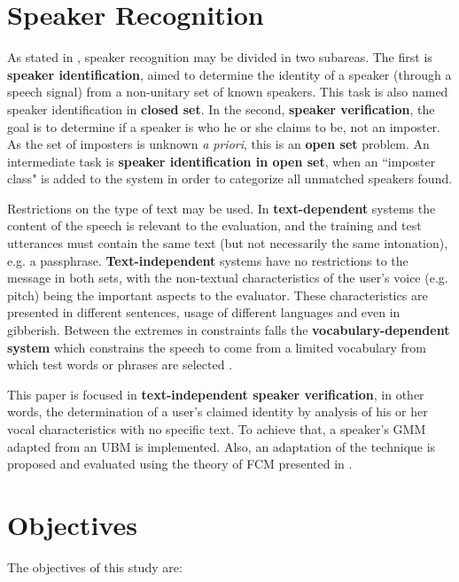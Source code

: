 \section{Speaker Recognition}

As stated in \autocite{pinheiro.2013}, speaker recognition may be divided in two subareas. The first is \textbf{speaker identification}, aimed to determine the identity of a speaker (through a speech signal) from a non-unitary set of known speakers. This task is also named speaker identification in \textbf{closed set}. In the second, \textbf{speaker verification}, the goal is to determine if a speaker is who he or she claims to be, not an imposter. As the set of imposters is unknown \emph{a priori}, this is an \textbf{open set} problem. An intermediate task is \textbf{speaker identification in open set}, when an ``imposter class" is added to the system in order to categorize all unmatched speakers found.

Restrictions on the type of text may be used. In \textbf{text-dependent} systems the content of the speech is relevant to the evaluation, and the training and test utterances must contain the same text (but not necessarily the same intonation), e.g. a passphrase. \textbf{Text-independent} systems have no restrictions to the message in both sets, with the non-textual characteristics of the user's voice (e.g. pitch) being the important aspects to the evaluator. These characteristics are presented in different sentences, usage of different languages and even in gibberish. Between the extremes in constraints falls the \textbf{vocabulary-dependent system} which constrains the speech to come from a limited vocabulary from which test words or phrases are selected \autocite{reynolds.1995}.

This paper is focused in \textbf{text-independent speaker verification}, in other words, the determination of a user's claimed identity by analysis of his or her vocal characteristics with no specific text. To achieve that, a speaker's GMM adapted from an UBM \autocite{reynolds.quatieri.dunn.2000} is implemented. Also, an adaptation of the technique is proposed and evaluated using the theory of FCM presented in \autocite{gao.zhou.pu.2013}.

\section{Objectives}

The objectives of this study are:

